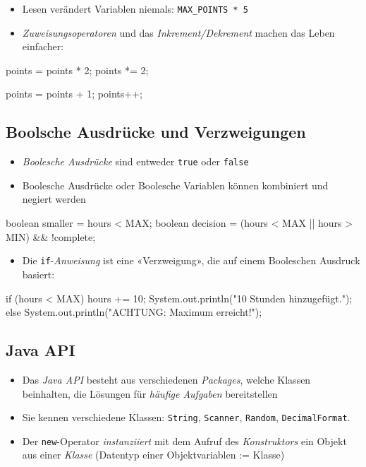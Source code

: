 \documentclass[a4paper,10pt, dvipsnames]{report}
\newcommand{\javaInLine}[1]{\texttt{#1}}
\begin{document}
\begin{itemize}
	\item Lesen verändert Variablen niemals: \javaInLine{MAX\_POINTS * 5}
	\item \textit{Zuweisungsoperatoren} und das \textit{Inkrement/Dekrement} machen das Leben einfacher:
\end{itemize}

\begin{javacodebox}
points = points * 2;
points *= 2;

points = points + 1;
points++;
\end{javacodebox}

\subsection{Boolsche Ausdrücke und Verzweigungen}

\begin{itemize}
	\item \textit{Boolesche Ausdrücke} sind entweder \javaInLine{true} oder \javaInLine{false}
	\item Boolesche Ausdrücke oder Boolesche Variablen können kombiniert und negiert werden
\end{itemize}

\begin{javacodebox}
boolean smaller = hours < MAX;
boolean decision = (hours < MAX || hours > MIN) && !complete;
\end{javacodebox}

\begin{itemize}
	\item Die \javaInLine{if}-\textit{Anweisung} ist eine «Verzweigung», die auf einem Booleschen Ausdruck basiert:
\end{itemize}

\begin{javacodebox}
if (hours < MAX) {
    hours += 10;
    System.out.println("10 Stunden hinzugefügt.");
    } else
    System.out.println("ACHTUNG: Maximum erreicht!");
\end{javacodebox}

\subsection{Java API}

\begin{itemize}
    \item Das \textit{Java API} besteht aus verschiedenen \textit{Packages}, welche Klassen beinhalten, die Lösungen für \textit{häufige Aufgaben} bereitstellen
    \item Sie kennen verschiedene Klassen: \javaInLine{String}, \javaInLine{Scanner}, \javaInLine{Random}, \javaInLine{DecimalFormat}.
    \item Der \javaInLine{new}-Operator \textit{instanziiert} mit dem Aufruf des \textit{Konstruktors} ein Objekt aus einer \textit{Klasse} (Datentyp einer Objektvariablen := Klasse)
\end{itemize}
\end{document}
